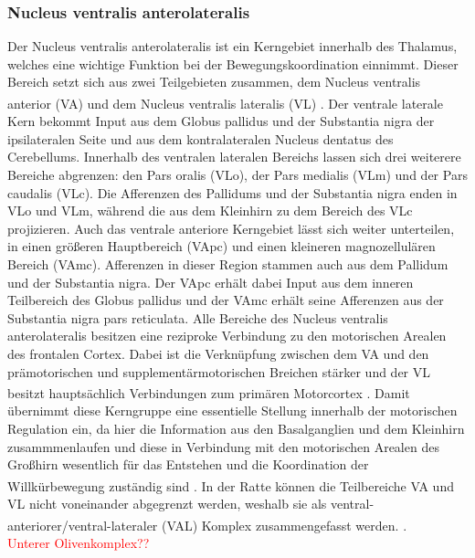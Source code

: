 \documentclass[12pt,a4paper,pdftex]{article}
\begin{document}
\subsubsection{Nucleus ventralis anterolateralis} 
Der Nucleus ventralis anterolateralis ist ein Kerngebiet innerhalb des Thalamus, welches eine wichtige Funktion bei der Bewegungskoordination einnimmt. Dieser Bereich setzt sich aus zwei Teilgebieten zusammen, dem Nucleus ventralis anterior (VA) und dem Nucleus ventralis lateralis (VL) \textsuperscript{\cite[8]{trepel2011neuroanatomie}}. Der ventrale laterale Kern bekommt Input aus dem  Globus pallidus und der Substantia nigra der ipsilateralen Seite und aus dem kontralateralen Nucleus dentatus des Cerebellums. Innerhalb des ventralen lateralen Bereichs lassen sich drei weiterere Bereiche abgrenzen: den Pars oralis (VLo), der Pars medialis (VLm) und der Pars caudalis (VLc). Die Afferenzen des Pallidums und der Substantia nigra enden in VLo und VLm, während die aus dem Kleinhirn zu dem Bereich des VLc projizieren. Auch das ventrale anteriore Kerngebiet lässt sich weiter unterteilen, in einen größeren Hauptbereich (VApc) und einen kleineren magnozellulären Bereich (VAmc). Afferenzen in dieser Region stammen auch aus dem Pallidum und der Substantia nigra. Der VApc erhält dabei Input aus dem inneren Teilbereich des Globus pallidus und der VAmc erhält seine Afferenzen aus der Substantia nigra pars reticulata. Alle Bereiche des Nucleus ventralis anterolateralis besitzen eine reziproke Verbindung zu den motorischen Arealen des frontalen Cortex. Dabei ist die Verknüpfung zwischen dem VA und den prämotorischen und supplementärmotorischen Breichen stärker und der VL besitzt hauptsächlich Verbindungen zum primären Motorcortex \textsuperscript{\cite[12]{crossman2014neuroanatomy}}. Damit übernimmt diese Kerngruppe eine essentielle Stellung innerhalb der motorischen Regulation ein, da hier die Information aus den Basalganglien und dem Kleinhirn zusammmenlaufen und diese in Verbindung mit den motorischen Arealen des Großhirn wesentlich für das Entstehen und die Koordination der Willkürbewegung zuständig sind \textsuperscript{\cite[8]{trepel2011neuroanatomie}}. In der Ratte können die Teilbereiche VA und VL nicht voneinander abgegrenzt werden, weshalb sie als ventral-anteriorer/ventral-lateraler (VAL) Komplex zusammengefasst werden. \textsuperscript{\cite[16]{paxinos2014rat}}.     
\\
\textcolor{red}{Unterer Olivenkomplex??}
\end{document}
